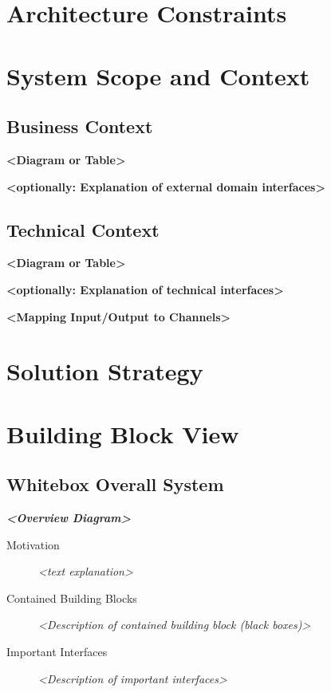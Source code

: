 \section{Architecture
Constraints}\label{section-architecture-constraints}

\section{System Scope and
Context}\label{section-system-scope-and-context}

\subsection{Business Context}\label{_business_context}

\textbf{\textless{}Diagram or Table\textgreater{}}

\textbf{\textless{}optionally: Explanation of external domain
interfaces\textgreater{}}

\subsection{Technical Context}\label{_technical_context}

\textbf{\textless{}Diagram or Table\textgreater{}}

\textbf{\textless{}optionally: Explanation of technical
interfaces\textgreater{}}

\textbf{\textless{}Mapping Input/Output to Channels\textgreater{}}

\section{Solution Strategy}\label{section-solution-strategy}

\section{Building Block View}\label{section-building-block-view}

\subsection{Whitebox Overall System}\label{_whitebox_overall_system}

\emph{\textbf{\textless{}Overview Diagram\textgreater{}}}

\begin{description}
\item[Motivation]
\emph{\textless{}text explanation\textgreater{}}
\item[Contained Building Blocks]
\emph{\textless{}Description of contained building block (black
boxes)\textgreater{}}
\item[Important Interfaces]
\emph{\textless{}Description of important interfaces\textgreater{}}
\end{description}

